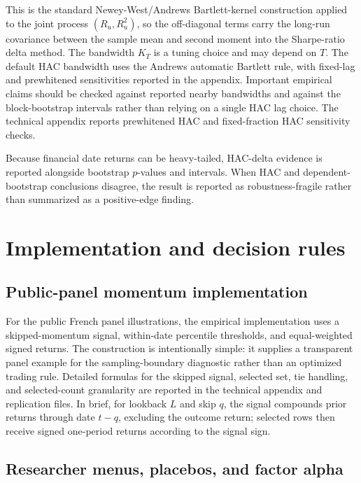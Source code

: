\documentclass[12pt,a4paper]{article}
\begin{document}
This is the standard Newey-West/Andrews Bartlett-kernel construction
\citep{newey1987simple,andrews1991heteroskedasticity} applied to the
joint process \((R_u,R_u^2)\), so the off-diagonal terms carry the
long-run covariance between the sample mean and second moment into the
Sharpe-ratio delta method.
The bandwidth \(K_T\) is a tuning choice and may depend on \(T\).  The
default HAC bandwidth uses the Andrews automatic Bartlett rule, with
fixed-lag and prewhitened sensitivities reported in the appendix.
Important empirical claims should be checked against reported nearby
bandwidths and against the block-bootstrap intervals rather than relying
on a single HAC lag choice.
The technical appendix reports prewhitened HAC and fixed-fraction HAC
sensitivity checks.

Because financial date returns can be heavy-tailed, HAC-delta evidence
is reported alongside bootstrap \(p\)-values and intervals.  When HAC
and dependent-bootstrap conclusions disagree, the result is reported as
robustness-fragile rather than summarized as a positive-edge finding.

\section{Implementation and decision rules}

\subsection{Public-panel momentum implementation}

For the public French panel illustrations, the empirical implementation
uses a skipped-momentum signal, within-date percentile thresholds, and
equal-weighted signed returns.  The construction is intentionally simple:
it supplies a transparent panel example for the sampling-boundary
diagnostic rather than an optimized trading rule.  Detailed formulas for
the skipped signal, selected set, tie handling, and selected-count
granularity are reported in the technical appendix and replication files.
In brief, for lookback \(L\) and skip \(q\), the signal compounds prior
returns through date \(t-q\), excluding the outcome return; selected
rows then receive signed one-period returns according to the signal
sign.

\subsection{Researcher menus, placebos, and factor alpha}
\end{document}
